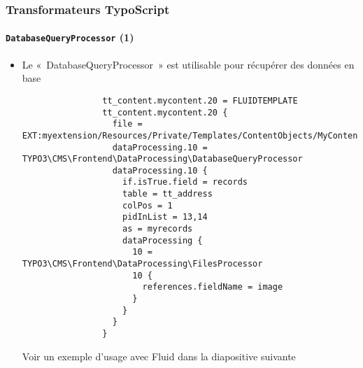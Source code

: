 \begin{frame}[fragile]
	\frametitle{Transformateurs TypoScript}
	\framesubtitle{\texttt{DatabaseQueryProcessor} (1)}

	\lstset{basicstyle=\tiny\ttfamily}

	\begin{itemize}

		\item Le «~DatabaseQueryProcessor~» est utilisable pour récupérer des données en base

			\begin{lstlisting}
				tt_content.mycontent.20 = FLUIDTEMPLATE
				tt_content.mycontent.20 {
				  file = EXT:myextension/Resources/Private/Templates/ContentObjects/MyContent.html
				  dataProcessing.10 = TYPO3\CMS\Frontend\DataProcessing\DatabaseQueryProcessor
				  dataProcessing.10 {
				    if.isTrue.field = records
				    table = tt_address
				    colPos = 1
				    pidInList = 13,14
				    as = myrecords
				    dataProcessing {
				      10 = TYPO3\CMS\Frontend\DataProcessing\FilesProcessor
				      10 {
				        references.fieldName = image
				      }
				    }
				  }
				}
			\end{lstlisting}


			\vspace{-0.2cm}
			\small
				Voir un exemple d'usage avec Fluid dans la diapositive suivante
			\normalsize

	\end{itemize}

\end{frame}



